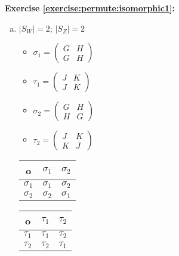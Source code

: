\noindent\textbf{Exercise \ref{exercise:permute:isomorphic1}:} 
\begin{enumerate}[(a)]
\item
$|S_W| = 2$; $|S_Z| = 2$\\
	\begin{multicols}{2}
	\begin{itemize}
	\item
	$\sigma_1 = \begin{pmatrix}
	G & H\\
	G & H
	\end{pmatrix}$

	\item
	$\tau_1 = \begin{pmatrix}
	J & K\\
	J & K
	\end{pmatrix}$

	\item
	$\sigma_2 = \begin{pmatrix}
	G & H\\
	H & G
	\end{pmatrix}$

	\item
	$\tau_2 = \begin{pmatrix}
	J & K\\
	K & J
	\end{pmatrix}$\\	
	\end{itemize}
	\end{multicols}
	
	\begin{multicols}{2}
	\begin{tabular}{c| c c }
		o & $\sigma_1$ & $\sigma_2$\\
		\hline
		$\sigma_1$ & $\sigma_1$ & $\sigma_2$\\
		$\sigma_2$ & $\sigma_2$ & $\sigma_1$\\
	\end{tabular}

	\begin{tabular}{c| c c }
		o & $\tau_1$ & $\tau_2$ \\
		\hline
		$\tau_1$ & $\tau_1$ & $\tau_2$\\
		$\tau_2$ & $\tau_2$ & $\tau_1$\\
	\end{tabular}
	\end{multicols}
	

\end{enumerate}
